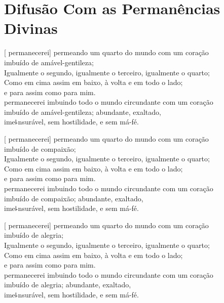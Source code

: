 \chapter[Permanências Divinas]{Difusão Com as Permanências Divinas}

\enlargethispage{\baselineskip}


\begin{leader}
\end{leader}

[ permanecerei] permeando um quarto do mundo com um coração\\
\vin imbuído de amável-gentileza;\\
Igualmente o segundo, igualmente o terceiro, igualmente o quarto;\\
Como em cima assim em baixo, à volta e em todo o lado;\\
\vin e para  assim como para mim.\\
 permanecerei imbuindo todo o mundo circundante com um coração \\
\vin imbuído de amável-gentileza; abundante, exaltado,\\
\vin ime꜕nsurável, sem hostilidade, e sem má-fé.

[ permanecerei] permeando um quarto do mundo com um coração\\
\vin imbuído de compaixão;\\
Igualmente o segundo, igualmente o terceiro, igualmente o quarto;\\
Como em cima assim em baixo, à volta e em todo o lado;\\
\vin e para  assim como para mim.\\
 permanecerei imbuindo todo o mundo circundante com um coração\\
\vin imbuído de compaixão; abundante, exaltado,\\
\vin ime꜕nsurável, sem hostilidade, e sem má-fé.

[ permanecerei] permeando um quarto do mundo com um coração\\
\vin imbuído de alegria;\\
Igualmente o segundo, igualmente o terceiro, igualmente o quarto;\\
Como em cima assim em baixo, à volta e em todo o lado;\\
\vin e para  assim como para mim.\\
 permanecerei imbuindo todo o mundo circundante com um coração\\
\vin imbuído de alegria; abundante, exaltado,\\
\vin ime꜕nsurável, sem hostilidade, e sem má-fé.


